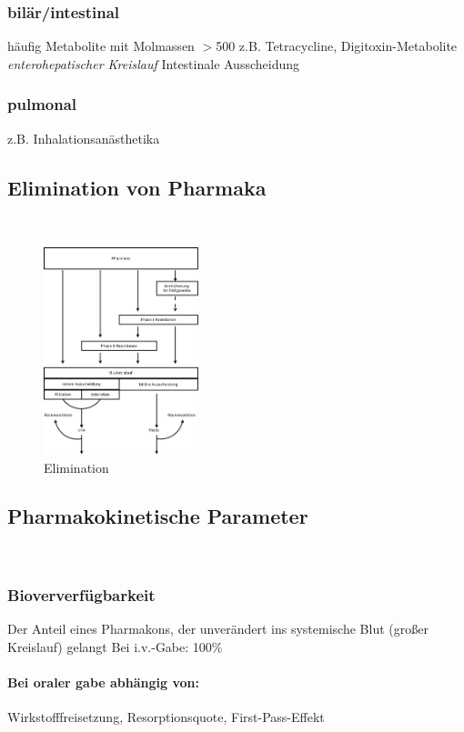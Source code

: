 \documentclass[10pt,a4paper]{report}
\begin{document}
\subsubsection{bilär/intestinal} häufig Metabolite mit Molmassen $>$500 z.B. Tetracycline, Digitoxin-Metabolite
\textit{enterohepatischer Kreislauf} Intestinale Ausscheidung
\subsubsection{pulmonal}
z.B. Inhalationsanästhetika
\subsection{Elimination von Pharmaka} \mbox{} \\
\begin{figure}[h]
	\centering 
	\includegraphics[width=0.4\textwidth]{Elimination.png} 
	\caption{Elimination} 
	\label{fig:Elimination}
\end{figure}
\subsection{Pharmakokinetische Parameter} \mbox{} \\
\subsubsection{Bioververfügbarkeit}
Der Anteil eines Pharmakons, der unverändert ins systemische Blut (großer Kreislauf) gelangt
Bei i.v.-Gabe: 100\%\\
\paragraph{Bei oraler gabe abhängig von:} Wirkstofffreisetzung,	Resorptionsquote, First-Pass-Effekt\\
\end{document}
